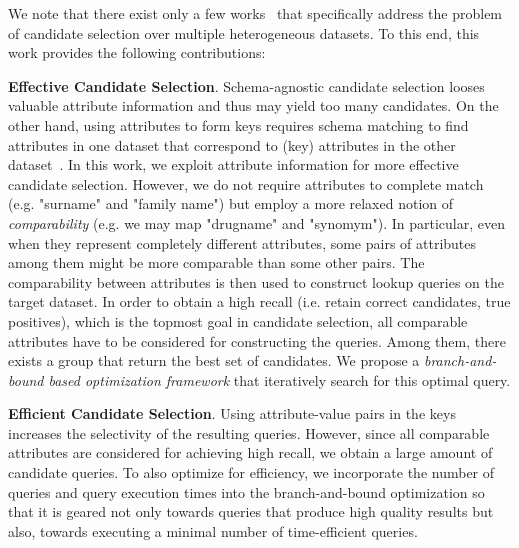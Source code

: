  

We note that there exist only a few works~\cite{DBLP:conf/semweb/SongH11,papadakis_efficient_2011} that specifically address the problem of candidate selection over multiple heterogeneous datasets. To this end, this work provides the following contributions: 

\textbf{Effective Candidate Selection}. Schema-agnostic candidate selection looses valuable attribute information and thus may yield too many candidates. On the other hand, using attributes to form keys requires schema matching\cite{DBLP:conf/ic3k/ScharffeE11} to find attributes in one dataset that correspond to (key) attributes in the other dataset~\cite{DBLP:conf/semweb/SongH11}. 
In this work, we exploit attribute information for more effective candidate selection. However, we do not require attributes to complete match (e.g. "surname" and "family name") but employ a more relaxed notion of \emph{comparability} (e.g. we may map "drugname" and "synomym"). In particular, even when they represent completely different attributes, some pairs of attributes among them might be more comparable than some other pairs. The comparability between attributes is then used to construct lookup queries on the target dataset. In order to obtain a high recall (i.e. retain correct candidates, true positives), which is the topmost goal in candidate selection, all comparable attributes have to be considered for constructing the queries. Among them, there exists a group that return the best set of candidates. We propose a \emph{branch-and-bound based optimization framework} that iteratively search for this optimal query. 

\textbf{Efficient Candidate Selection}. 
Using attribute-value pairs in the keys increases the selectivity of the resulting queries. However, since all comparable attributes are considered for achieving high recall, we obtain a large amount of candidate queries. To also optimize for efficiency, we incorporate the number of queries and query execution times into the branch-and-bound optimization so that it is geared not only towards queries that produce high quality results but also, towards executing a minimal number of time-efficient queries. 

